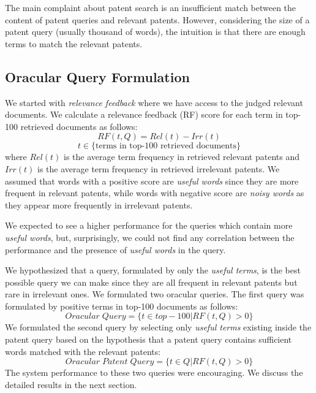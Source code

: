 The main complaint about patent search is an insufficient match between the content of patent queries and relevant
patents\cite{lupu2013patent}\cite{magdy2012toward}. However, considering the size of a patent query (usually thousand of words), the intuition is that there are enough terms to match the relevant patents. 
\subsection{Oracular Query Formulation}
We started with {\em relevance feedback} where we have access to the judged relevant documents. We calculate a relevance feedback (RF) score for each term in top-100 retrieved documents as follows:
\begin{equation}
RF(t,Q)=Rel(t)-Irr(t) 
 \label{eq:score}
\end{equation}\vspace*{-5ex}
\begin{displaymath}t\in \lbrace \mbox{terms in top-100 retrieved documents}\rbrace\end{displaymath}
where $ Rel(t) $ is the average term frequency in retrieved relevant patents and $ Irr(t) $ is the average term frequency in retrieved irrelevant patents. We assumed that words with a positive score are {\em useful words} since they are more frequent in relevant patents, while words with negative score are {\em noisy words} as they appear more frequently in irrelevant patents. 

We expected to see a higher performance for the queries which contain more {\em useful words}, but, surprisingly, we could not find any correlation between the performance and the presence of {\em useful words} in the query. 

We hypothesized that a query, formulated by only the {\em useful terms}, is the best possible query we can make since they are all frequent in relevant patents but rare in irrelevant ones. We formulated two oracular queries. The first query was formulated by positive terms in top-100 documents as follows: 
\begin{equation}
Oracular \; Query = \{t \in top-100|RF(t, Q)>0\}   
 \label{eq:score}
\end{equation}
We formulated the second query by selecting only {\em useful terms} existing inside the patent query based on the hypothesis that a patent query contains sufficient words matched with the relevant patents:
\begin{equation}
 Oracular \; Patent \; Query = \{t\in Q|RF(t, Q)>0\}   
 \label{eq:score}
\end{equation}
The system performance to these two queries were encouraging. We discuss the detailed results in the next section.


